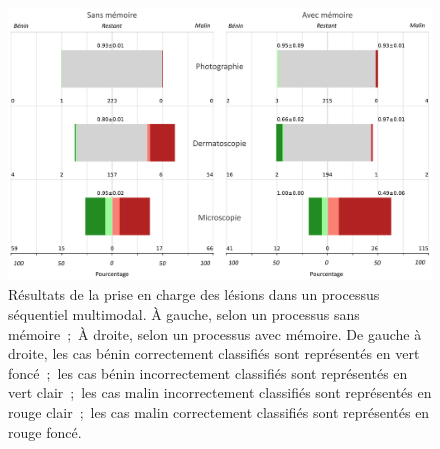\begin{figure}[H]
    \centering
    \includegraphics[width=0.9\linewidth]{contents/chapter_8/resources/results_lesions_management.pdf}
    \caption{Résultats de la prise en charge des lésions dans un processus séquentiel multimodal. À gauche, selon un processus sans mémoire~;~À droite, selon un processus avec mémoire. De gauche à droite, les cas bénin correctement classifiés sont représentés en vert foncé~;~les cas bénin incorrectement classifiés sont représentés en vert clair~;~les cas malin incorrectement classifiés sont représentés en rouge clair~;~les cas malin correctement classifiés sont représentés en rouge foncé.}
    \label{fig:results_lesions_management}
\end{figure}\par

